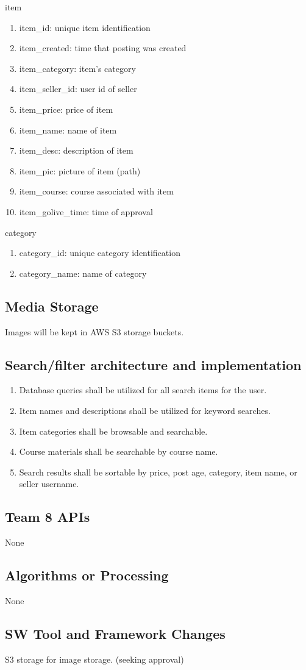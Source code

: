 %
{\large item}
\begin{enumerate}
\item item\_id: unique item identification
\item item\_created: time that posting was created
\item item\_category: item's category
\item item\_seller\_id: user id of seller
\item item\_price: price of item
\item item\_name: name of item
\item item\_desc: description of item
\item item\_pic: picture of item (path)
\item item\_course: course associated with item
\item item\_golive\_time: time of approval 
\end{enumerate}%
%
{\large category}
\begin{enumerate}
\item category\_id: unique category identification
\item category\_name: name of category
\end{enumerate}

\subsection{Media Storage}
Images will be kept in AWS S3 storage buckets.

\subsection{Search/filter architecture and implementation}
\begin{enumerate}
\item Database queries shall be utilized for all search items for the user.
\item Item names and descriptions shall be utilized for keyword searches.
\item Item categories shall be browsable and searchable.
\item Course materials shall be searchable by course name.
\item Search results shall be sortable by price, post age, category, item name, or seller username.
\end{enumerate}

\subsection{Team 8 APIs}
None

\subsection{Algorithms or Processing}
None

\subsection{SW Tool and Framework Changes}
S3 storage for image storage. (seeking approval)

